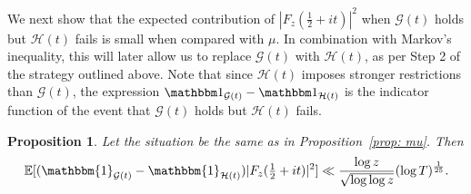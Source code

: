 \documentclass[12pt, notitlepage]{amsart}
\numberwithin{equation}{section}
\def\E{\mathbb E}
\newtheorem{proposition}[theorem]{Proposition}
\theoremstyle{remark}
\theoremstyle{definition}
\theoremstyle{remark}
\numberwithin{equation}{section}
\begin{document}
 
 We next show that the expected contribution of $|F_z(\tfrac 12+it)|^2$ when $\mathcal{G}(t)$ holds but $\mathcal{H}(t)$ fails is small when compared with $\mu$. In combination with Markov's inequality, this will later allow us to replace $\mathcal{G}(t)$ with $\mathcal{H}(t)$, as per Step 2 of the strategy outlined above.  Note that since ${\mathcal H}(t)$ imposes stronger restrictions than ${\mathcal G}(t)$, the expression ${\mathbbm 1}_{{\mathcal G}(t)}- {\mathbbm 1}_{{\mathcal H}(t)}$ is the indicator function of the event that ${\mathcal G}(t)$ holds but ${\mathcal H}(t)$ fails.  

 \begin{proposition}\label{prop: Hfail}
 Let the situation be the same as in Proposition~\ref{prop: mu}. Then 
 \[\E[(\mathbbm{1}_{\mathcal{G}(t)}-\mathbbm{1}_{\mathcal{H}(t)})|F_z(\tfrac 12+it)|^{2} ]  \ll \frac{\log z}{\sqrt{\log \log z}} (\log T)^{\frac 1{25}}. 
 \]
 \end{proposition}
\end{document}

